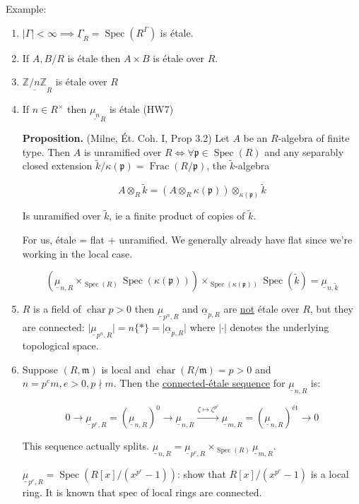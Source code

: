 \documentclass{article}
\theoremstyle{definition}
\numberwithin{theorem}{subsection}
\begin{document}
    Example:

    \begin{enumerate}[label=\arabic*)]
        \item \(\vert \Gamma \vert < \infty \implies \underline{\Gamma}_R = \operatorname{Spec}(R^\Gamma)\) is \'etale.
        \item If \(A,B / R\) is \'etale then \(A \times B\) is \'etale over \(R\).
        \item \(\underline{\mathbb{Z} / n\mathbb{Z}}_R\) is \'etale over \(R\)
        \item If \(n\in R^\times\) then \(\underline{\mu_n}_R\) is \'etale (HW7)
    
        \textbf{Proposition.} (Milne, \'Et. Coh. I, Prop 3.2) Let \(A\) be an \(R\)-algebra of finite type. Then \(A\) is unramified over \(R \iff \forall \mathfrak{p} \in \operatorname{Spec}(R)\) and any separably closed extension \(\widetilde{k} / \kappa(\mathfrak{p}) = \operatorname{Frac}(R / \mathfrak{p})\), the \(\widetilde{k}\)-algebra 

        \[
            A \otimes_R \widetilde{k} = (A \otimes_R \kappa(\mathfrak{p})) \otimes_{\kappa(\mathfrak{p})} \widetilde{k}
        \]

        Is unramified over \(\widetilde{k}\), ie a finite product of copies of \(\widetilde{k}\).

        For us, \'etale = flat + unramified. We generally already have flat since we're working in the local case.

        \[
            \left( \underline{\mu}_{n,R} \times_{\operatorname{Spec}(R)} \operatorname{Spec}(\kappa(\mathfrak{p} )) \right) \times_{\operatorname{Spec}(\kappa(\mathfrak{p}))} \operatorname{Spec}(\widetilde{k}) = \underline{\mu}_{n,\widetilde{k}}
        \]

        \item \(R\) is a field of \(\operatorname{char} p > 0\) then \(\underline{\mu}_{p^n, R}\) and \(\underline{\alpha}_{p,R}\) are \underline{not} \'etale over \(R\), but they are connected: \(\vert \underline{\mu}_{p^n, R} \vert =n \{ \ast \} = \vert \underline{\alpha}_{p,R} \vert \) where \(\vert \cdot \vert\) denotes the underlying topological space.
        \item Suppose \((R,\mathfrak{m})\) is local and \(\operatorname{char}(R / \mathfrak{m}) = p > 0\) and \(n = p^e m, e > 0, p\nmid m\). Then the \underline{connected-\'etale sequence} for \(\underline{\mu}_{n,R}\) is:
        
        \[
            0 \to \underline{\mu}_{p^e, R} = (\underline{\mu}_{n,R})^0 \to \underline{\mu}_{n,R} \xrightarrow{\zeta \mapsto \zeta^{p^e}} \underline{\mu}_{m,R} = (\underline{\mu}_{n,R})^{\text{\'et}} \to 0
        \]

        This sequence actually splits. \(\underline{\mu}_{n,R} = \underline{\mu}_{p^e, R} \times_{\operatorname{Spec}(R)} \underline{\mu}_{m,R}\).
        
        \(\underline{\mu}_{p^e,R} = \operatorname{Spec}(R[x] / (x^{p^e} - 1))\): show that \(R[x] / (x^{p^e} - 1)\) is a local ring. It is known that spec of local rings are connected.

    \end{enumerate}
\end{document}
